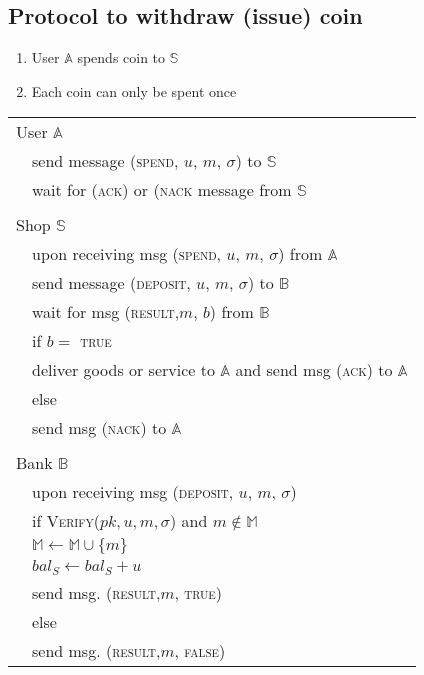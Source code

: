 \documentclass{report}
\begin{document}
\begin{adjustwidth}{2em}{2em}
	\subsection{Protocol to withdraw (issue) coin}
	\begin{adjustwidth}{2em}{}
		\begin{enumerate}[-]
			\item User $\mathbb{A}$ spends coin to $\mathbb{S}$
			\item Each coin can only be spent once
		\end{enumerate}
	\end{adjustwidth}
	\begin{tikzpicture}
	\end{tikzpicture}
	\begin{tabular}{ll}
		\multicolumn{2}{l}{User $\mathbb{A}$} \\
		& send message (\textsc{spend}, $u$, $m$, $\sigma$) to $\mathbb{S}$ \\
		& wait for (\textsc{ack}) or (\textsc{nack} message from $\mathbb{S}$ \\
		\\
		\multicolumn{2}{l}{Shop $\mathbb{S}$} \\
		& upon receiving msg (\textsc{spend}, $u$, $m$, $\sigma$) from $\mathbb{A}$ \\
		& send message (\textsc{deposit}, $u$, $m$, $\sigma$) to $\mathbb{B}$ \\
		& wait for msg (\textsc{result},$m$, $b$) from $\mathbb{B}$ \\
		& if $b = $ \textsc{true} \\
		& \indent deliver goods or service to $\mathbb{A}$ and send msg (\textsc{ack}) to $\mathbb{A}$ \\
		& else \\
		& \indent send msg (\textsc{nack}) to $\mathbb{A}$ \\
		\\
		\multicolumn{2}{l}{Bank $\mathbb{B}$} \\
		& upon receiving msg (\textsc{deposit}, $u$, $m$, $\sigma$) \\
		& if \textsc{Verify($pk, u, m, \sigma$)} and $m \not\in \mathbb{M}$ \\
		& \indent $\mathbb{M} \leftarrow \mathbb{M} \cup \{ m \}$ \\
		& \indent $bal_S \leftarrow bal_S + u$ \\
		& \indent send msg. (\textsc{result},$m$, \textsc{true}) \\
		& else \\
		& \indent send msg. (\textsc{result},$m$, \textsc{false}) \\
	\end{tabular}
\end{adjustwidth}
\end{document}
